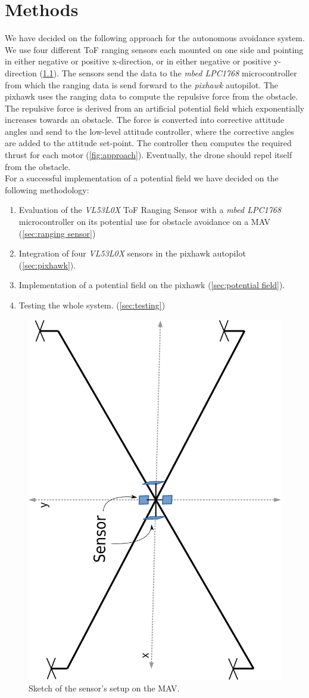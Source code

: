 \chapter{Methods}
\label{ch:methods}
We have decided on the following approach for the autonomous avoidance system. We use four different ToF ranging sensors each mounted on one side and pointing in either negative or positive x-direction, or in either negative or positive y-direction (\cref{fig:sketch}). The sensors send the data to the \textit{mbed LPC1768} microcontroller from which the ranging data is send forward to the \textit{pixhawk} autopilot. The pixhawk  uses the ranging data to compute the repulsive force from the obstacle. The repulsive force is derived from an artificial potential field which exponentially increases towards an obstacle. The force is converted into corrective attitude angles and send to the low-level attitude controller, where the corrective angles are added to the attitude set-point. The controller then computes the required thrust for each motor (\cref{fig:approach}). Eventually, the drone should repel itself from the obstacle.\\

For a successful implementation of a potential field we have decided on the following methodology:
\begin{enumerate}
	\item Evaluation of the \textit{VL53L0X} ToF Ranging Sensor with a \textit{mbed LPC1768} microcontroller on its potential use for obstacle avoidance on a MAV (\cref{sec:ranging sensor})
	\item Integration of four \textit{VL53L0X} sensors in the pixhawk autopilot (\cref{sec:pixhawk}).
	\item Implementation of a potential field on the pixhawk (\cref{sec:potential field}).
	\item Testing the whole system.  (\cref{sec:testing})
\end{enumerate}

\begin{figure}
	\centering
	\includegraphics[width=0.4\linewidth, angle = 270]{pictures/mav_sketch.pdf}
	\caption{Sketch of the sensor's setup on the MAV.}
	\label{fig:sketch}
\end{figure}


